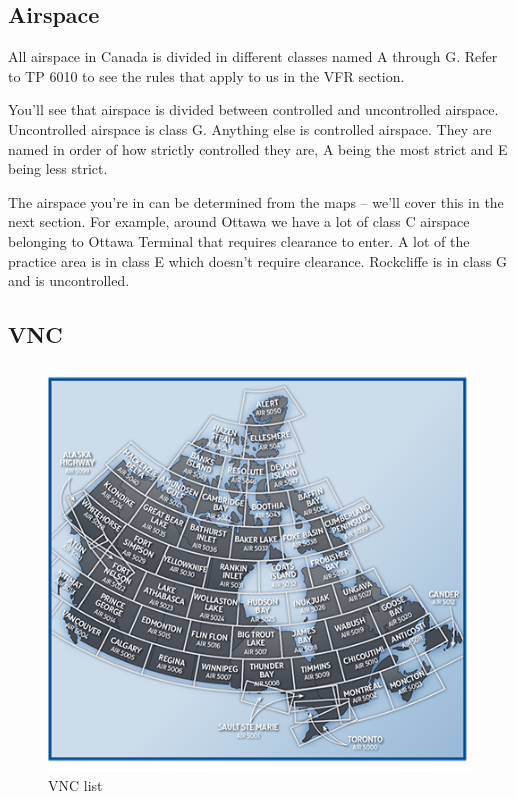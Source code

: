 \documentclass[12pt,letterpaper]{article}
\begin{document}
        \subsection{Airspace}
        All airspace in Canada is divided in different classes named A through G. Refer to TP 6010 to see the rules that apply to us in the VFR section. 
        
        You'll see that airspace is divided between controlled and uncontrolled airspace. Uncontrolled airspace is class G. Anything else is controlled airspace. They are named in order of how strictly controlled they are, A being the most strict and E being less strict.
        
        The airspace you're in can be determined from the maps -- we'll cover this in the next section. For example, around Ottawa we have a lot of class C airspace belonging to Ottawa Terminal that requires clearance to enter. A lot of the practice area is in class E which doesn't require clearance. Rockcliffe is in class G and is uncontrolled.
        
        \subsection{VNC}
        \begin{figure}
            \centering
            \includegraphics[scale=0.75]{vncs.png}
            \caption{VNC list}
            \label{fig:vnclist}
        \end{figure}
\end{document}
